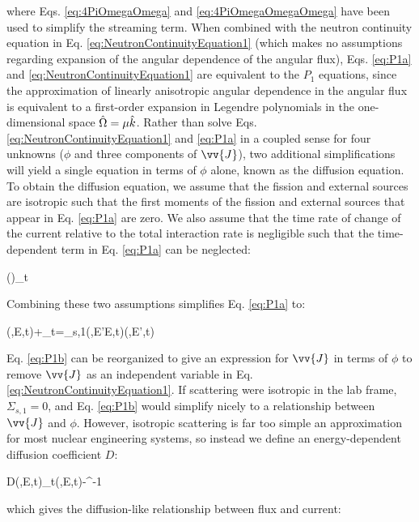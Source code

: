 where Eqs. \eqref{eq:4PiOmegaOmega} and \eqref{eq:4PiOmegaOmegaOmega} have been used to simplify the streaming term. When combined with the neutron continuity equation in Eq. \eqref{eq:NeutronContinuityEquation1} (which makes no assumptions regarding expansion of the angular dependence of the angular flux), Eqs. \eqref{eq:P1a} and \eqref{eq:NeutronContinuityEquation1} are equivalent to the \(P_1\) equations, since the approximation of linearly anisotropic angular dependence in the angular flux is equivalent to a first-order expansion in Legendre polynomials in the one-dimensional space \(\hat{\Omega}=\mu\hat{k}\). Rather than solve Eqs. \eqref{eq:NeutronContinuityEquation1} and \eqref{eq:P1a} in a coupled sense for four unknowns (\(\phi\) and three components of \(\vv{J}\)), two additional simplifications will yield a single equation in terms of \(\phi\) alone, known as the diffusion equation. To obtain the diffusion equation, we assume that the fission and external sources are isotropic such that the first moments of the fission and external sources that appear in Eq. \eqref{eq:P1a} are zero. We also assume that the time rate of change of the current relative to the total interaction rate is negligible such that the time-dependent term in Eq. \eqref{eq:P1a} can be neglected:

\beq
{}\left(\right)\ll\Sigma_t
\eeq

Combining these two assumptions simplifies Eq. \eqref{eq:P1a} to:

\beq
\label{eq:P1b}
\nabla\phi(,E,t)+\Sigma_t\sset{}\sset=\dEprime \Sigma_{s,1}(,E'\rightarrow E,t)(,E',t)
\eeq

Eq. \eqref{eq:P1b} can be reorganized to give an expression for \(\vv{J}\) in terms of \(\phi\) to remove \(\vv{J}\) as an independent variable in Eq. \eqref{eq:NeutronContinuityEquation1}. If scattering were isotropic in the lab frame, \(\Sigma_{s,1}=0\), and Eq. \eqref{eq:P1b} would simplify nicely to a relationship between \(\vv{J}\) and \(\phi\). However, isotropic scattering is far too simple an approximation for most nuclear engineering systems, so instead we define an energy-dependent diffusion coefficient \(D\):

\beq
\label{eq:DiffusionCoeff}
D(,E,t)\equiv{}\left\lbrack\Sigma_t(,E,t)-\right\rbrack^{-1}
\eeq

which gives the diffusion-like relationship between flux and current:


